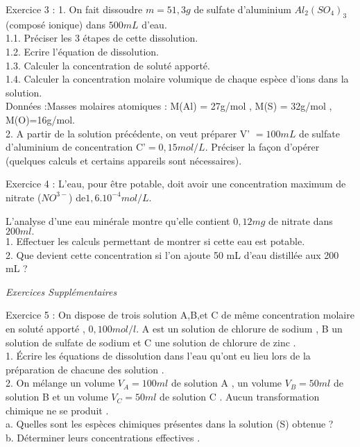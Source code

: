\documentclass[12pt, french]{article}
\begin{document}
\begin{Box2}{Exercice 3 :}
1. On fait dissoudre $m = 51,3 g$ de sulfate d'aluminium $Al_2(SO_4)_3$ (composé ionique) dans $500 mL$ d'eau.\\
1.1. Préciser les 3 étapes de cette dissolution.\\
1.2. Ecrire l'équation de dissolution.\\
1.3. Calculer la concentration de soluté apporté.\\
1.4. Calculer la concentration molaire volumique de chaque espèce d'ions dans la solution.\\
Données :Masses molaires atomiques : M(Al) = 27g/mol , M(S) = 32g/mol , M(O)=16g/mol.
\\2. A partir de la solution précédente, on veut préparer V' $= 100 mL$ de sulfate d'aluminium de concentration C'$= 0,15 mol / L.$
Préciser la façon d'opérer (quelques calculs et certains appareils sont nécessaires).

\end{Box2}

\begin{Box2}{Exercice 4 : }
   L'eau, pour être potable, doit avoir une concentration maximum de nitrate ($NO^{3-}$) de$1,6.10^{-4} mol/L.$

L'analyse d'une eau minérale montre qu'elle contient $0,12 mg$ de nitrate dans $200 ml.$\\
1. Effectuer les calculs permettant de montrer si cette eau est potable.\\
2. Que devient cette concentration si l'on ajoute 50 mL d'eau distillée aux 200 mL ?
\end{Box2}

\vspace{2cm}
\begin{center}
   \Large{ \em{Exercices Supplémentaires}}
\end{center}
\begin{Box2}{Exercice 5 : }
On dispose de trois solution A,B,et C de même concentration molaire en soluté apporté , 
$0, 100mol/l.$ A est un solution de chlorure de sodium , B un solution de sulfate de sodium et C
une solution de chlorure de zinc .\\
1. Écrire les équations de dissolution dans l’eau qu’ont eu lieu lors de la préparation de
chacune des solution .\\
2. On mélange un volume $V_A = 100ml$ de solution A , un volume $V_B = 50ml$ de solution B
et un volume $V_C = 50ml$ de solution C . Aucun transformation chimique ne se produit .\\
a. Quelles sont les espèces chimiques présentes dans la solution (S) obtenue ?\\
b. Déterminer leurs concentrations effectives .\\
\end{Box2}
\end{document}
